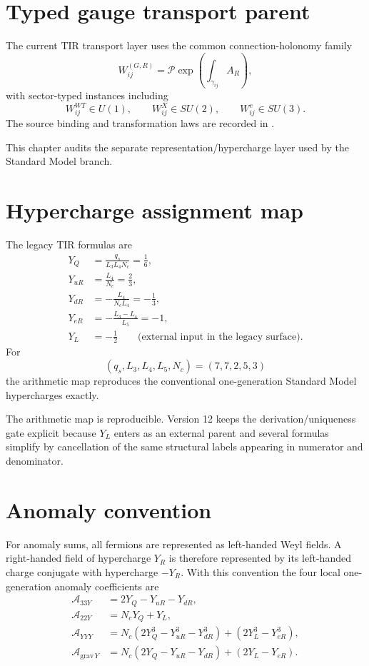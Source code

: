 \section{Typed gauge transport parent}

The current TIR transport layer uses the common connection-holonomy family
\[
W_{ij}^{(G,R)}
=\mathcal P\exp\!\left(\int_{\gamma_{ij}}A_R\right),
\]
with sector-typed instances including
\[
W_{ij}^{WT}\in U(1),
\qquad
W_{ij}^{X}\in SU(2),
\qquad
W_{ij}^{c}\in SU(3).
\]
The source binding and transformation laws are recorded in
.

This chapter audits the separate representation/hypercharge layer used by the Standard Model branch.

\section{Hypercharge assignment map}

The legacy TIR formulas are
\begin{align}
Y_Q&=\frac{q_s}{L_3L_4N_c}=\frac16,\\
Y_{uR}&=\frac{L_4}{N_c}=\frac23,\\
Y_{dR}&=-\frac{L_4}{N_cL_4}=-\frac13,\\
Y_{eR}&=-\frac{L_3-L_4}{L_5}=-1,\\
Y_L&=-\frac12\qquad\text{(external input in the legacy surface)}.
\end{align}
For
\[
(q_s,L_3,L_4,L_5,N_c)=(7,7,2,5,3)
\]
the arithmetic map reproduces the conventional one-generation Standard Model hypercharges exactly.

The arithmetic map is reproducible. Version 12 keeps the derivation/uniqueness gate explicit because $Y_L$ enters as an external parent and several formulas simplify by cancellation of the same structural labels appearing in numerator and denominator.

\section{Anomaly convention}

For anomaly sums, all fermions are represented as left-handed Weyl fields. A right-handed field of hypercharge $Y_R$ is therefore represented by its left-handed charge conjugate with hypercharge $-Y_R$. With this convention the four local one-generation anomaly coefficients are
\begin{align}
\mathcal A_{33Y}
&=2Y_Q-Y_{uR}-Y_{dR},\\
\mathcal A_{22Y}
&=N_cY_Q+Y_L,\\
\mathcal A_{YYY}
&=N_c\left(2Y_Q^3-Y_{uR}^3-Y_{dR}^3\right)
 +\left(2Y_L^3-Y_{eR}^3\right),\\
\mathcal A_{\mathrm{grav}\,Y}
&=N_c\left(2Y_Q-Y_{uR}-Y_{dR}\right)
 +\left(2Y_L-Y_{eR}\right).
\end{align}

